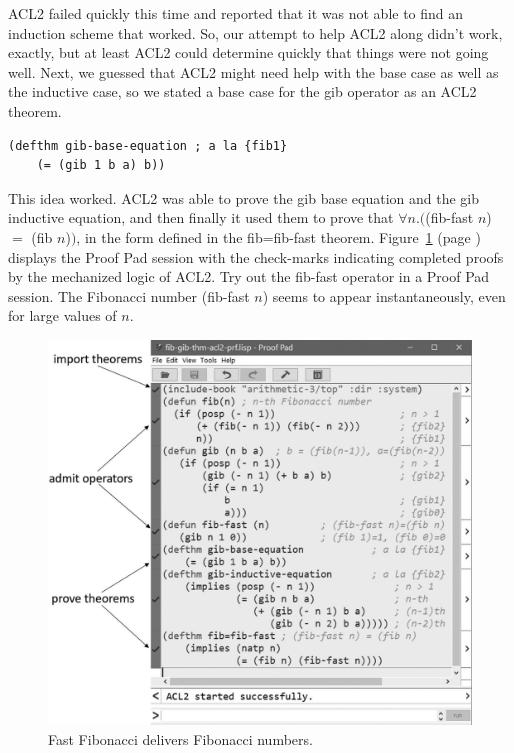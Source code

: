 ACL2 failed quickly this time and reported that it was not able
to find an induction scheme that worked.
So, our attempt to help ACL2 along didn't work, exactly, %
but at least ACL2 could determine quickly that
things were not going well.
Next, we guessed that ACL2 might need help with the
base case as well as the inductive case, so we
stated a base case for the \textsf{gib} operator as an ACL2 theorem.
\begin{center}
\begin{code}
\begin{verbatim}
(defthm gib-base-equation ; a la {fib1}
    (= (gib 1 b a) b))
\end{verbatim}
\end{code}
\end{center}

This idea worked. ACL2 was able to prove the gib base equation
and the gib inductive equation, and then finally it
used them to prove that $\forall n.($\textsf{(fib-fast $n$)} $=$ \textsf{(fib $n$)}$)$,
in the form defined in the \textsf{fib=fib-fast} theorem.
Figure~\ref{fig:fib-gib-thm} (page \pageref{fig:fib-gib-thm})
displays the Proof Pad session with the check-marks
indicating completed proofs by the mechanized logic of ACL2.
Try out the \textsf{fib-fast} operator in a Proof Pad session.
The Fibonacci number \textsf{(fib-fast $n$)} seems to appear
instantaneously, even for large values of $n$.

\begin{figure}
\begin{center}
\includegraphics[scale=1]{images-cmyk/fib-gib-thm-acl2-prf}
\end{center}
\caption{Fast Fibonacci delivers Fibonacci numbers.}
\label{fig:fib-gib-thm}
\end{figure}

